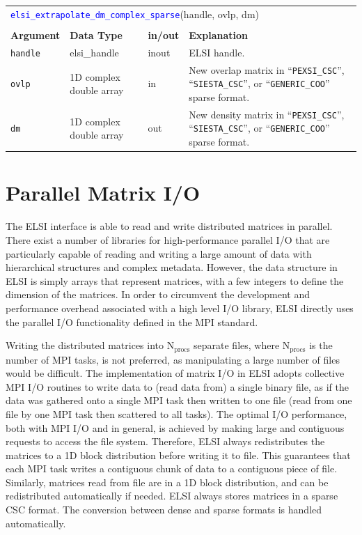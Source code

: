 \documentclass{report}
\newcommand{\api}[1]{\textcolor{blue}{\texttt{#1}}}
\begin{document}
\begin{tabular}[]{|p{20mm}|p{40mm}|p{10mm}|p{92mm}|}
\multicolumn{4}{l}{\api{elsi\_extrapolate\_dm\_complex\_sparse}(handle, ovlp, dm)}\\
\multicolumn{4}{l}{}\\
\hline
\multicolumn{1}{|l|}{\textbf{Argument}} & \multicolumn{1}{l|}{\textbf{Data Type}} & \multicolumn{1}{l|}{\textbf{in/out}} & \multicolumn{1}{l|}{\textbf{Explanation}}\\
\hline
\texttt{handle} & elsi\_handle            & inout & ELSI handle.\\
\hline
\texttt{ovlp}   & 1D complex double array & in    & New overlap matrix in ``\texttt{PEXSI\_CSC}'', ``\texttt{SIESTA\_CSC}'', or ``\texttt{GENERIC\_COO}'' sparse format.\\
\hline
\texttt{dm}     & 1D complex double array & out   & New density matrix in ``\texttt{PEXSI\_CSC}'', ``\texttt{SIESTA\_CSC}'', or ``\texttt{GENERIC\_COO}'' sparse format.\\
\hline
\end{tabular}

\section{Parallel Matrix I/O}
\label{sec:rw}
The ELSI interface is able to read and write distributed matrices in parallel. There exist a number of libraries for high-performance parallel I/O that are particularly capable of reading and writing a large amount of data with hierarchical structures and complex metadata. However, the data structure in ELSI is simply arrays that represent matrices, with a few integers to define the dimension of the matrices. In order to circumvent the development and performance overhead associated with a high level I/O library, ELSI directly uses the parallel I/O functionality defined in the MPI standard.

Writing the distributed matrices into $\text{N}_\text{procs}$ separate files, where $\text{N}_\text{procs}$ is the number of MPI tasks, is not preferred, as manipulating a large number of files would be difficult. The implementation of matrix I/O in ELSI adopts collective MPI I/O routines to write data to (read data from) a single binary file, as if the data was gathered onto a single MPI task then written to one file (read from one file by one MPI task then scattered to all tasks). The optimal I/O performance, both with MPI I/O and in general, is achieved by making large and contiguous requests to access the file system. Therefore, ELSI always redistributes the matrices to a 1D block distribution before writing it to file. This guarantees that each MPI task writes a contiguous chunk of data to a contiguous piece of file. Similarly, matrices read from file are in a 1D block distribution, and can be redistributed automatically if needed. ELSI always stores matrices in a sparse CSC format. The conversion between dense and sparse formats is handled automatically.
\end{document}
